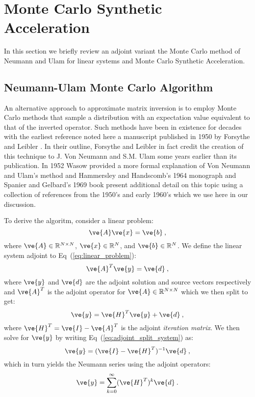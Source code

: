 \documentclass[letterpaper,11pt]{article}
\begin{document}
\section{Monte Carlo Synthetic Acceleration}
\label{sec:mcsa}
In this section we briefly review an adjoint variant the Monte Carlo
method of Neumann and Ulam for linear systems and Monte Carlo
Synthetic Acceleration.

\subsection{Neumann-Ulam Monte Carlo Algorithm}
An alternative approach to approximate matrix inversion is to employ
Monte Carlo methods that sample a distribution with an expectation
value equivalent to that of the inverted operator. Such methods have
been in existence for decades with the earliest reference noted here a
manuscript published in 1950 by Forsythe and Leibler
\cite{forsythe_matrix_1950}. In their outline, Forsythe and Leibler
in fact credit the creation of this technique to J. Von Neumann and
S.M. Ulam some years earlier than its publication. In 1952 Wasow
provided a more formal explanation of Von Neumann and Ulam's method
\cite{wasow_note_1952} and Hammersley and Handscomb's 1964 monograph
\cite{hammersley_monte_1964} and Spanier and Gelbard's 1969 book
\cite{spanier_monte_1969} present additional detail on this topic
using a collection of references from the 1950's and early
1960's which we use here in our discussion.

To derive the algoritm, consider a linear problem:
\begin{equation}
  \ve{A} \ve{x} = \ve{b}\:,
  \label{eq:linear_problem}
\end{equation}
where $\ve{A} \in \mathbb{R}^{N \times N}$, $\ve{x} \in \mathbb{R}^N$,
and $\ve{b} \in \mathbb{R}^N$. We define the linear system adjoint to
Eq~(\ref{eq:linear_problem}):
\begin{equation}
  \ve{A}^T \ve{y} = \ve{d}\:,
  \label{eq:adjoint_linear_problem}
\end{equation}
where $\ve{y}$ and $\ve{d}$ are the adjoint solution and source
vectors respectively and $\ve{A}^T$ is the adjoint operator for
$\ve{A} \in \mathbb{R}^{N \times N}$ which we then split to get:
\begin{equation}
  \ve{y} = \ve{H}^T \ve{y} + \ve{d}\:,
  \label{eq:adjoint_split_system}
\end{equation}
where $\ve{H}^T = \ve{I} - \ve{A}^T$ is the adjoint \textit{iteration
  matrix}.  We then solve for $\ve{y}$ by writing
Eq~(\ref{eq:adjoint_split_system}) as:
\begin{equation}
  \ve{y} = (\ve{I} - \ve{H}^T)^{-1} \ve{d}\:,
  \label{eq:adjoint_split_system_2}
\end{equation}
which in turn yields the Neumann series using the adjoint operators:
\begin{equation}
  \ve{y} = \sum_{k=0}^{\infty} (\ve{H}^T)^k\ve{d}\:.
  \label{eq:adjoint_neumann_series}
\end{equation}
\end{document}
